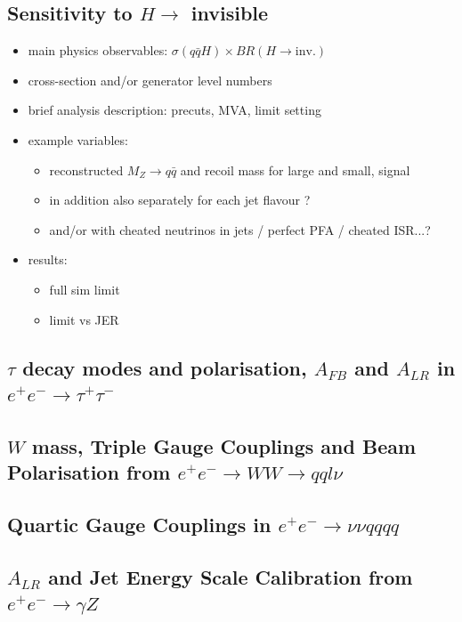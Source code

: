 \subsection{Sensitivity to $H \to $ invisible}
\begin{itemize}
\item main physics observables: $\sigma(q\bar{q} H)\times BR(H \to \mbox{inv.})$
\item cross-section and/or generator level numbers 
\item brief analysis description: precuts, MVA, limit setting
\item example variables:
  \begin{itemize}
     \item reconstructed $M_Z \to q\bar{q}$ and recoil mass for large and small, signal      \item in addition also separately for each jet flavour ?
     \item and/or with cheated neutrinos in jets / perfect PFA / cheated ISR...?
  \end{itemize}
\item results: 
  \begin{itemize}
     \item full sim limit
     \item limit vs JER
  \end{itemize}
\end{itemize}

\subsection{$\tau$ decay modes and polarisation, $A_{FB}$ and $A_{LR}$ in $e^+e^- \to \tau^+\tau^-$}
\subsection{$W$ mass, Triple Gauge Couplings and Beam Polarisation from $e^+e^- \to WW \to qql\nu$}
\subsection{Quartic Gauge Couplings in $e^+e^- \to \nu\nu qqqq$}
\subsection{$A_{LR}$ and Jet Energy Scale Calibration from $e^+e^- \to \gamma Z$}

